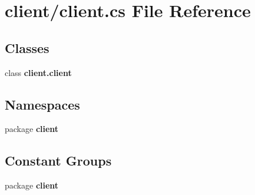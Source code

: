 \section{client/client.cs File Reference}
\label{client_8cs}
\subsection*{Classes}
\begin{DoxyCompactItemize}
\item 
class {\bf client.\-client}
\end{DoxyCompactItemize}
\subsection*{Namespaces}
\begin{DoxyCompactItemize}
\item 
package {\bf client}
\end{DoxyCompactItemize}
\subsection*{Constant Groups}
\begin{DoxyCompactItemize}
\item 
package {\bf client}
\end{DoxyCompactItemize}

